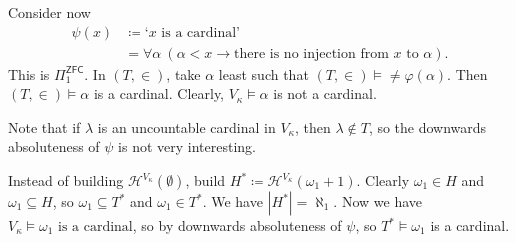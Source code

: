 \documentclass{article}
\DeclareMathOperator{\tcl}{tcl}
\let\models\vDash
\begin{document}
Consider now
\begin{align*}
  \psi(x) &\coloneqq  \text{`}x \text{ is a cardinal'} \\
  &= \forall \alpha \ (\alpha < x \rightarrow \text{there is no injection from $x$ to $\alpha$}).
\end{align*}
This is $\Pi_1^{\textsf{ZFC}}$. In $(T,\in)$, take $\alpha$ least such that $(T,\in) \models \neq\varphi(\alpha)$.
Then $(T,\in) \models \alpha$ is a cardinal. Clearly, $V_\kappa \models \alpha$ is not a cardinal.

Note that if  $\lambda$ is an uncountable cardinal in $V_\kappa$, then $\lambda \notin T$, so the downwards absoluteness of $\psi$ is not very interesting.

Instead of building $\mathcal{H}^{V_\kappa}(\emptyset)$, build $H^* \coloneqq \mathcal{H}^{V_\kappa}(\omega_1 + 1)$.
Clearly $\omega_1 \in H$ and $\omega_1 \subseteq H$, so $\omega_1 \subseteq T^*$ and $\omega_1 \in T^*$. We have $|H^*| = \aleph_1$.
Now we have $V_\kappa \models \omega_1 \text{ is a cardinal}$, so by downwards absoluteness of $\psi$, so $T^* \models \omega_1$ is a cardinal.

\printindex
\end{document}
